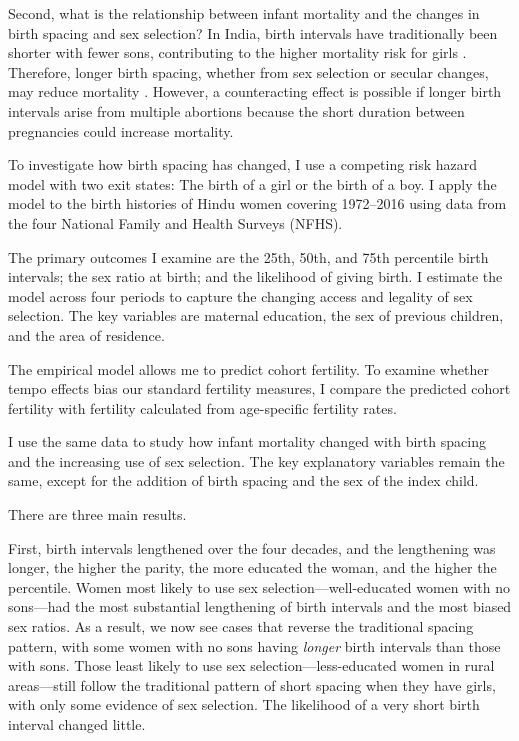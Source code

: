 \documentclass[12pt,letterpaper]{article}
\begin{document}
Second, what is the relationship between infant mortality and the changes in birth spacing 
and sex selection?
In India, birth intervals have traditionally been shorter with fewer sons, contributing 
to the higher mortality risk for girls
\citep{Whitworth2002,Bhalotra2008,Maitra2008,Jayachandran2011,Jayachandran2017a}.
Therefore, longer birth spacing, whether from sex selection or secular changes, may reduce 
mortality \citep{Conde-Agudelo2012,Molitoris2019}.
However, a counteracting effect is possible if longer birth intervals arise from multiple 
abortions because the short duration between pregnancies could increase mortality. 


To investigate how birth spacing has changed, I use a competing risk hazard model with 
two exit states: The birth of a girl or the birth of a boy. 
I apply the model to the birth histories of Hindu women covering 1972--2016 using 
data from the four National Family and Health Surveys (NFHS). 

The primary outcomes I examine are the 25th, 50th, and 75th percentile birth intervals;
the sex ratio at birth; and the likelihood of giving birth. 
I estimate the model across four periods to capture the changing access and 
legality of sex selection. 
The key variables are maternal education, the sex of previous children, and the area of 
residence.

The empirical model allows me to predict cohort fertility. 
To examine whether tempo effects bias our standard fertility measures, I compare 
the predicted cohort fertility with fertility calculated from age-specific fertility 
rates.

I use the same data to study how infant mortality changed with birth spacing and 
the increasing use of sex selection. 
The key explanatory variables remain the same, except for the addition of birth spacing 
and the sex of the index child. 

There are three main results.

First, birth intervals lengthened over the four decades, and the lengthening was longer, 
the higher the parity, the more educated the woman, and the higher the percentile. 
Women most likely to use sex selection---well-educated women with no sons---had the most 
substantial lengthening of birth intervals and the most biased sex ratios. 
As a result, we now see cases that reverse the traditional spacing pattern, with some 
women with no sons having \emph{longer} birth intervals than those with sons. 
Those least likely to use sex selection---less-educated women in rural areas---still follow the 
traditional pattern of short spacing when they have girls, with only some evidence of sex 
selection. 
The likelihood of a very short birth interval changed little. 
\end{document}
